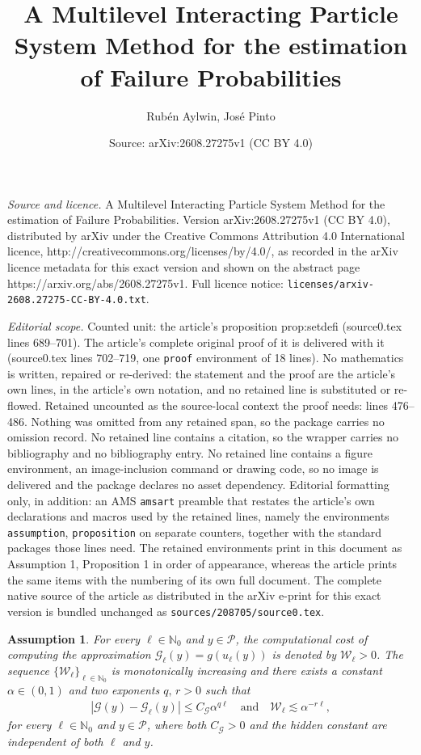 \documentclass[10pt,a4paper]{amsart}
\title{A Multilevel Interacting Particle System Method for the estimation of Failure Probabilities}
\author{Rub\'en Aylwin, Jos\'e Pinto}
\date{Source: arXiv:2608.27275v1 (CC BY 4.0)}
\newtheorem{assumption}{Assumption}
\newcommand{\IN}{\mathbb{N}}
\newcommand{\abs}[1]{{\left\vert #1 \right\vert}}
\newcommand{\cG}{\mathcal{G}}
\newcommand{\cP}{\mathcal{P}}
\newcommand{\cW}{\mathcal{W}}
\begin{document}
\maketitle

\noindent\emph{Source and licence.} A Multilevel Interacting Particle System Method for the estimation of Failure Probabilities. Version arXiv:2608.27275v1 (CC BY 4.0), distributed by arXiv under the Creative Commons Attribution 4.0 International licence, http://creativecommons.org/licenses/by/4.0/, as recorded in the arXiv licence metadata for this exact version and shown on the abstract page https://arxiv.org/abs/2608.27275v1. Full licence notice: \texttt{licenses/arxiv-2608.27275-CC-BY-4.0.txt}.\par\smallskip

\noindent\textit{Editorial scope.} Counted unit: the article's proposition prop:setdefi (source0.tex lines 689--701). The article's complete original proof of it is delivered with it (source0.tex lines 702--719, one \texttt{proof} environment of 18 lines). No mathematics is written, repaired or re-derived: the statement and the proof are the article's own lines, in the article's own notation, and no retained line is substituted or re-flowed.  Retained uncounted as the source-local context the proof needs: lines 476--486.  Nothing was omitted from any retained span, so the package carries no omission record.  No retained line contains a citation, so the wrapper carries no bibliography and no bibliography entry.  No retained line contains a figure environment, an image-inclusion command or drawing code, so no image is delivered and the package declares no asset dependency.  Editorial formatting only, in addition: an AMS \texttt{amsart} preamble that restates the article's own declarations and macros used by the retained lines, namely the environments \texttt{assumption}, \texttt{proposition} on separate counters, together with the standard packages those lines need.  The retained environments print in this document as Assumption 1, Proposition 1 in order of appearance, whereas the article prints the same items with the numbering of its own full document.  The complete native source of the article as distributed in the arXiv e-print for this exact version is bundled unchanged as \texttt{sources/208705/source0.tex}.
\begin{assumption}
  \label{as:numap}
  For every $\ell\in\IN_0$ and $y\in\cP$, the computational cost of computing the
  approximation $\cG_\ell(y)=g(u_\ell(y))$ is denoted by $\cW_\ell>0$. The sequence
  $\{\cW_\ell\}_{\ell\in\IN_0}$ is monotonically increasing and there exists a constant
  $\alpha\in(0,1)$ and two exponents $q,\,r>0$ such that
  \begin{align*}
    \abs{\cG(y)-\cG_\ell(y)}\leq C_{\cG}\alpha^{q\ell}\quad\text{and}\quad \cW_\ell \lesssim\alpha^{-r\ell},
  \end{align*}
  for every $\ell\in\IN_0$ and $y\in\cP$, where both $C_{\cG}>0$ and the hidden constant are independent of both $\ell$ and $y$.
\end{assumption}
\end{document}
